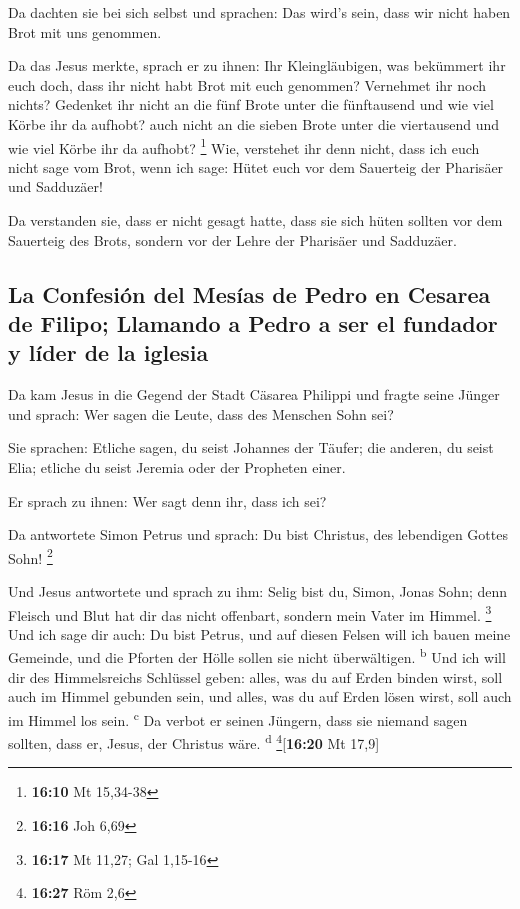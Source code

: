  Da dachten sie bei sich selbst und sprachen: Das wird's
sein, dass wir nicht haben Brot mit uns genommen.

 Da das Jesus merkte, sprach er zu ihnen: Ihr
Kleingläubigen, was bekümmert ihr euch doch, dass ihr nicht habt Brot
mit euch genommen?  Vernehmet ihr noch nichts? Gedenket
ihr nicht an die fünf Brote unter die fünftausend und wie viel Körbe ihr
da aufhobt?  auch nicht an die sieben Brote unter die
viertausend und wie viel Körbe ihr da aufhobt? \footnote{\textbf{16:10}
  Mt 15,34-38}  Wie, verstehet ihr denn nicht, dass ich
euch nicht sage vom Brot, wenn ich sage: Hütet euch vor dem Sauerteig
der Pharisäer und Sadduzäer!

 Da verstanden sie, dass er nicht gesagt hatte, dass sie
sich hüten sollten vor dem Sauerteig des Brots, sondern vor der Lehre
der Pharisäer und Sadduzäer.

\hypertarget{la-confesiuxf3n-del-mesuxedas-de-pedro-en-cesarea-de-filipo-llamando-a-pedro-a-ser-el-fundador-y-luxedder-de-la-iglesia}{%
\subsection{La Confesión del Mesías de Pedro en Cesarea de Filipo;
Llamando a Pedro a ser el fundador y líder de la
iglesia}\label{la-confesiuxf3n-del-mesuxedas-de-pedro-en-cesarea-de-filipo-llamando-a-pedro-a-ser-el-fundador-y-luxedder-de-la-iglesia}}

 Da kam Jesus in die Gegend der Stadt Cäsarea Philippi
und fragte seine Jünger und sprach: Wer sagen die Leute, dass des
Menschen Sohn sei?

 Sie sprachen: Etliche sagen, du seist Johannes der
Täufer; die anderen, du seist Elia; etliche du seist Jeremia oder der
Propheten einer.

 Er sprach zu ihnen: Wer sagt denn ihr, dass ich sei?

 Da antwortete Simon Petrus und sprach: Du bist Christus,
des lebendigen Gottes Sohn! \footnote{\textbf{16:16} Joh 6,69}

 Und Jesus antwortete und sprach zu ihm: Selig bist du,
Simon, Jonas Sohn; denn Fleisch und Blut hat dir das nicht offenbart,
sondern mein Vater im Himmel. \footnote{\textbf{16:17} Mt 11,27; Gal
  1,15-16}  Und ich sage dir auch: Du bist Petrus, und
auf diesen Felsen will ich bauen meine Gemeinde, und die Pforten der
Hölle sollen sie nicht überwältigen. \textsuperscript{b} 
Und ich will dir des Himmelsreichs Schlüssel geben: alles, was du auf
Erden binden wirst, soll auch im Himmel gebunden sein, und alles, was du
auf Erden lösen wirst, soll auch im Himmel los sein. \textsuperscript{c}
 Da verbot er seinen Jüngern, dass sie niemand sagen
sollten, dass er, Jesus, der Christus wäre. \textsuperscript{d}
\footnote{\textbf{16:27} Röm 2,6}{[}\textbf{16:20} Mt 17,9{]}

